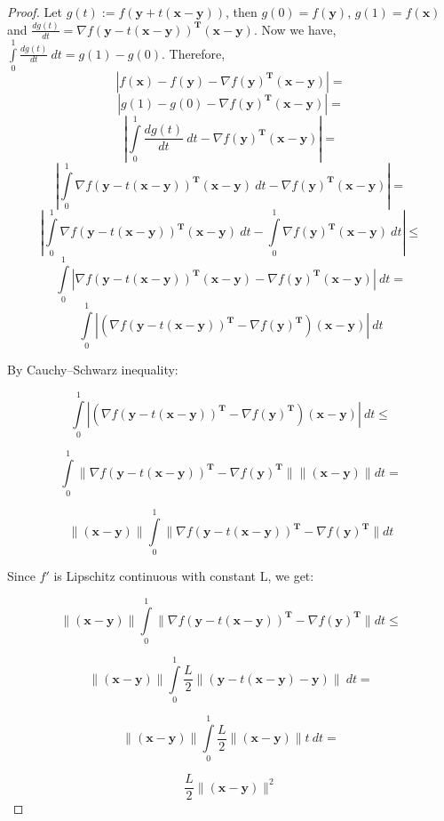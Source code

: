 \documentclass{article}
\begin{document}
\begin{proof}
Let $g(t):=f(\mathbf{y}+t(\mathbf{x}-\mathbf{y}))$, then $g(0)=f(\mathbf{y})$, $g(1)=f(\mathbf{x})$ and
\newline
$\frac{dg(t)}{dt}=\nabla f(\mathbf{y}-t(\mathbf{x}-\mathbf{y}))^\mathbf{T}(\mathbf{x}-\mathbf{y})$. Now we have,
$\int\limits_0^1 \frac{dg(t)}{dt} \ dt=g(1)-g(0)$. Therefore,
$$|f(\mathbf{x})-f(\mathbf{y})-\nabla f(\mathbf{y})^\mathbf{T}(\mathbf{x}-\mathbf{y})|=$$
$$|g(1)-g(0)-\nabla f(\mathbf{y})^\mathbf{T}(\mathbf{x}-\mathbf{y})|=$$
$$| \int\limits_0^1 \frac{dg(t)}{dt} \ dt-\nabla f(\mathbf{y})^\mathbf{T}(\mathbf{x}-\mathbf{y})|=$$
$$| \int\limits_0^1 \nabla f(\mathbf{y}-t(\mathbf{x}-\mathbf{y}))^\mathbf{T}(\mathbf{x}-\mathbf{y}) \ dt-\nabla f(\mathbf{y})^\mathbf{T}(\mathbf{x}-\mathbf{y})|=$$
$$| \int\limits_0^1 \nabla f(\mathbf{y}-t(\mathbf{x}-\mathbf{y}))^\mathbf{T}(\mathbf{x}-\mathbf{y}) \ dt-\int\limits_0^1 \nabla f(\mathbf{y})^\mathbf{T}(\mathbf{x}-\mathbf{y})\ dt|\leq$$
$$\int\limits_0^1 |\nabla f(\mathbf{y}-t(\mathbf{x}-\mathbf{y}))^\mathbf{T}(\mathbf{x}-\mathbf{y}) - \nabla f(\mathbf{y})^\mathbf{T}(\mathbf{x}-\mathbf{y})|\ dt=$$
$$\int\limits_0^1 |(\nabla f(\mathbf{y}-t(\mathbf{x}-\mathbf{y}))^\mathbf{T} - \nabla f(\mathbf{y})^\mathbf{T})(\mathbf{x}-\mathbf{y})|\ dt$$

By Cauchy–Schwarz inequality:

$$\int\limits_0^1 |(\nabla f(\mathbf{y}-t(\mathbf{x}-\mathbf{y}))^\mathbf{T} - \nabla f(\mathbf{y})^\mathbf{T})(\mathbf{x}-\mathbf{y})|\ dt \leq$$

$$\int\limits_0^1 \|\nabla f(\mathbf{y}-t(\mathbf{x}-\mathbf{y}))^\mathbf{T} - \nabla f(\mathbf{y})^\mathbf{T}\|\|(\mathbf{x}-\mathbf{y})\| dt=$$

$$ \|(\mathbf{x}-\mathbf{y})\| \int\limits_0^1 \|\nabla f(\mathbf{y}-t(\mathbf{x}-\mathbf{y}))^\mathbf{T} - \nabla f(\mathbf{y})^\mathbf{T}\|dt$$

Since $f'$ is Lipschitz continuous with constant L, we get:

$$ \|(\mathbf{x}-\mathbf{y})\| \int\limits_0^1 \|\nabla f(\mathbf{y}-t(\mathbf{x}-\mathbf{y}))^\mathbf{T} - \nabla f(\mathbf{y})^\mathbf{T}\|dt \leq$$

$$ \|(\mathbf{x}-\mathbf{y})\| \int\limits_0^1\frac{L}{2}\|(\mathbf{y}-t(\mathbf{x}-\mathbf{y})-\mathbf{y})\|\ dt=$$

$$ \|(\mathbf{x}-\mathbf{y})\| \int\limits_0^1\frac{L}{2}\|(\mathbf{x}-\mathbf{y})\|t\ dt=$$

$$\frac{L}{2}\|(\mathbf{x}-\mathbf{y})\|^2$$

\end{proof}
\end{document}
